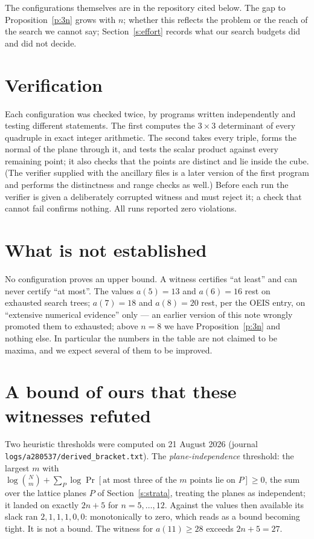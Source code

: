 \documentclass[11pt,a4paper]{article}
\begin{document}
The configurations themselves are in the repository cited below.  The gap to
Proposition~\ref{p:3n} grows with $n$; whether this reflects the problem or the reach of the
search we cannot say; Section~\ref{s:effort} records what our search budgets did and did not decide.

\section{Verification}
Each configuration was checked twice, by programs written independently and testing different
statements.  The first computes the $3\times3$ determinant of every quadruple in exact integer
arithmetic.  The second takes every triple, forms the normal of the plane through it, and tests
the scalar product against every remaining point; it also checks that the points are distinct
and lie inside the cube.  (The verifier supplied with the ancillary files is a later version of the
first program and performs the distinctness and range checks as well.)  Before each run the verifier is
given a deliberately corrupted witness and must reject it; a check that cannot fail confirms
nothing.  All runs reported zero violations.

\section{What is not established}\label{s:notest}
No configuration proves an upper bound.  A witness certifies ``at least'' and can never certify
``at most''.  The values $a(5)=13$ and $a(6)=16$ rest on exhausted search trees; $a(7)=18$ and
$a(8)=20$ rest, per the OEIS entry, on ``extensive numerical evidence'' only --- an earlier
version of this note wrongly promoted them to exhausted; above $n=8$ we have
Proposition~\ref{p:3n} and nothing else.  In particular the numbers
in the table are not claimed to be maxima, and we expect several of them to be improved.

\section{A bound of ours that these witnesses refuted}
Two heuristic thresholds were computed on 21 August 2026 (journal \texttt{logs/a280537/derived\_bracket.txt}).
The \emph{plane-independence} threshold: the largest $m$ with $\log\binom{N}{m}+\sum_P\log\Pr[\text{at most three
of the $m$ points lie on }P]\ge0$, the sum over the lattice planes $P$ of Section~\ref{s:strata}, treating the
planes as independent; it landed on exactly $2n+5$ for $n=5,\dots,12$.  Against the values then available its slack ran
$2,1,1,1,0,0$: monotonically to zero, which reads as a bound becoming tight.  It is not a bound.
The witness for $a(11)\ge28$ exceeds $2n+5=27$.
\end{document}
